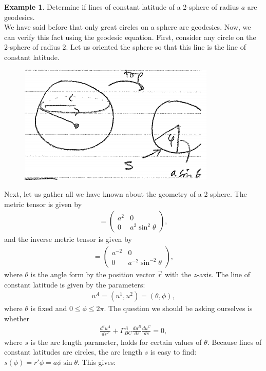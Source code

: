 \documentclass{book}
\theoremstyle{definition}
\newtheorem{exmp}{Example}[section]
\begin{document}
\begin{exmp}
	Determine if lines of constant latitude of a 2-sphere of radius $a$ are geodesics.\\
	
	We have said before that only great circles on a sphere are geodesics. Now, we can verify this fact using the geodesic equation. First, consider any circle on the 2-sphere of radius $2$. Let us oriented the sphere so that this line is the line of constant latitude. 
	\begin{figure}[!htb]
		\centering
		\includegraphics[scale=0.6]{angle}
	\end{figure}
	Next, let us gather all we have known about the geometry of a 2-sphere. The metric tensor is given by
	\begin{align*}
	[g_{AB}] = \begin{pmatrix}
	a^2 & 0 \\
	0 & a^2\sin^2\theta
	\end{pmatrix},
	\end{align*}
	and the inverse metric tensor is given by
	\begin{align*}
	[g^{AB}] = \begin{pmatrix}
	a^{-2} & 0\\
	0 & a^{-2}\sin^{-2}\theta
	\end{pmatrix},
	\end{align*}
	where $\theta$ is the angle form by the position vector $\vec{r}$ with the $z$-axis. The line of constant latitude is given by the parameters:
	\begin{align*}
	u^A = (u^1,u^2) = (\theta,\phi),
	\end{align*}
	where $\theta$ is fixed and $0 \leq \phi \leq 2\pi$. The question we should be asking ourselves is whether
	\begin{align*}
	\frac{d^2u^A}{ds^2} + \Gamma^{A}_{BC}\frac{du^B}{ds}\frac{du^C}{ds} = 0,
	\end{align*}
	where $s$ is the arc length parameter, holds for certain values of $\theta$. Because lines of constant latitudes are circles, the arc length $s$ is easy to find: $s(\phi) = r'\phi = a\phi\sin\theta$. This gives:

\end{exmp}
\end{document}
